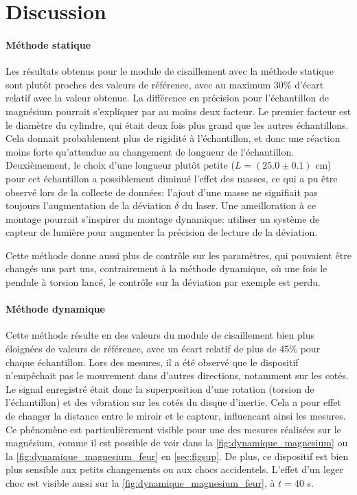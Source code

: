 \section{Discussion}

\paragraph{Méthode statique}
Les résultats obtenus pour le module de cisaillement avec la méthode statique sont plutôt proches des valeurs de référence, avec au maximum 30\% d'écart relatif avec la valeur obtenue. La différence en précision pour l'échantillon de magnésium pourrait s'expliquer par au moins deux facteur. Le premier facteur est le diamètre du cylindre, qui était deux fois plus grand que les autres échantillons. Cela donnait probablement plus de rigidité à l'échantillon, et donc une réaction moins forte qu'attendue au changement de longueur de l'échantillon. Deuxièmement, le choix d'une longueur plutôt petite ($L=(25.0\pm0.1)$ \si{\centi\meter}) pour cet échantillon a possiblement diminué l'effet des masses, ce qui a pu être observé lors de la collecte de données: l'ajout d'une masse ne signifiait pas toujours l'augmentation de la déviation $\delta$ du laser. Une ameilloration à ce montage pourrait s'inspirer du montage dynamique: utiliser un système de capteur de lumière pour augmenter la précision de lecture de la déviation.

Cette méthode donne aussi plus de contrôle sur les paramètres, qui pouvaient être changés uns part uns, contrairement à la méthode dynamique, où une fois le pendule à torsion lancé, le contrôle sur la déviation par exemple est perdu.

\paragraph{Méthode dynamique}
Cette méthode résulte en des valeurs du module de cisaillement bien plus éloignées de valeurs de référence, avec un écart relatif de plus de 45\% pour chaque échantillon. Lors des mesures, il a été observé que le dispositif n'empêchait pas le mouvement dans d'autres directions, notamment sur les cotés. Le signal enregistré était donc la superposition d'une rotation (torsion de l'échantillon) et des vibration sur les cotés du disque d'inertie. Cela a pour effet de changer la distance entre le miroir et le capteur, influencant ainsi les mesures. Ce phénomène est particulièrement visible pour une des mesures réalisées sur le magnésium, comme il est possible de voir dans la \autoref{fig:dynamique_magnesium} ou la \autoref{fig:dynamique_magnesium_feur} en \autoref{sec:figsup}. De plus, ce dispositif est bien plus sensible aux petits changements ou aux chocs accidentels. L'effet d'un leger choc est visible aussi sur la \autoref{fig:dynamique_magnesium_feur}, à $t=40$ \si{\second}.

